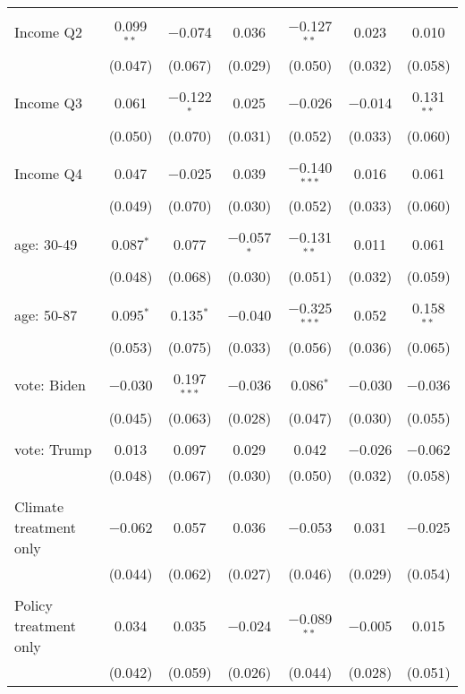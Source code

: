 \begin{tabular}{@{\extracolsep{5pt}}lcccccc}
  & & & & & & \\ 
 Income Q2 & 0.099$^{**}$ & $-$0.074 & 0.036 & $-$0.127$^{**}$ & 0.023 & 0.010 \\ 
  & (0.047) & (0.067) & (0.029) & (0.050) & (0.032) & (0.058) \\ 
  & & & & & & \\ 
 Income Q3 & 0.061 & $-$0.122$^{*}$ & 0.025 & $-$0.026 & $-$0.014 & 0.131$^{**}$ \\ 
  & (0.050) & (0.070) & (0.031) & (0.052) & (0.033) & (0.060) \\ 
  & & & & & & \\ 
 Income Q4 & 0.047 & $-$0.025 & 0.039 & $-$0.140$^{***}$ & 0.016 & 0.061 \\ 
  & (0.049) & (0.070) & (0.030) & (0.052) & (0.033) & (0.060) \\ 
  & & & & & & \\ 
 age: 30-49 & 0.087$^{*}$ & 0.077 & $-$0.057$^{*}$ & $-$0.131$^{**}$ & 0.011 & 0.061 \\ 
  & (0.048) & (0.068) & (0.030) & (0.051) & (0.032) & (0.059) \\ 
  & & & & & & \\ 
 age: 50-87 & 0.095$^{*}$ & 0.135$^{*}$ & $-$0.040 & $-$0.325$^{***}$ & 0.052 & 0.158$^{**}$ \\ 
  & (0.053) & (0.075) & (0.033) & (0.056) & (0.036) & (0.065) \\ 
  & & & & & & \\ 
 vote: Biden & $-$0.030 & 0.197$^{***}$ & $-$0.036 & 0.086$^{*}$ & $-$0.030 & $-$0.036 \\ 
  & (0.045) & (0.063) & (0.028) & (0.047) & (0.030) & (0.055) \\ 
  & & & & & & \\ 
 vote: Trump & 0.013 & 0.097 & 0.029 & 0.042 & $-$0.026 & $-$0.062 \\ 
  & (0.048) & (0.067) & (0.030) & (0.050) & (0.032) & (0.058) \\ 
  & & & & & & \\ 
 Climate treatment only & $-$0.062 & 0.057 & 0.036 & $-$0.053 & 0.031 & $-$0.025 \\ 
  & (0.044) & (0.062) & (0.027) & (0.046) & (0.029) & (0.054) \\ 
  & & & & & & \\ 
 Policy treatment only & 0.034 & 0.035 & $-$0.024 & $-$0.089$^{**}$ & $-$0.005 & 0.015 \\ 
  & (0.042) & (0.059) & (0.026) & (0.044) & (0.028) & (0.051) \\ 

\end{tabular}
